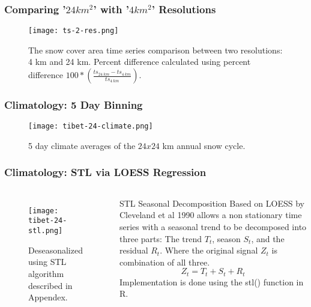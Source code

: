 \begin{frame}
\frametitle{Comparing '$24km^{2}$' with  '$4km^{2}$' Resolutions}
\begin{figure}
\vspace*{-.5cm}
\centering
\begin{minipage}{.7\columnwidth}
\texttt{[image: ts-2-res.png]}
\caption{The snow cover area time series comparison between two resolutions: 4 km and 24 km. Percent difference calculated using percent difference $100 * \left( \frac{ts_{24\ km} - ts_{4\ km}}{ts_{4\ km}} \right)$.}
\end{minipage}
\end{figure}
\end{frame}

\begin{frame}
\frametitle{Climatology: 5 Day Binning}
\begin{figure}
\centering
\begin{minipage}{.5\columnwidth}
\texttt{[image: tibet-24-climate.png]}
\caption{5 day climate averages of the $24 x 24$ km annual snow cycle.}
\end{minipage}
\end{figure}
\end{frame}

\begin{frame}
\frametitle{Climatology: STL via LOESS Regression}
\begin{columns}
\begin{figure}
\centering
\begin{minipage}{1\columnwidth}
\texttt{[image: tibet-24-stl.png]}
\caption{Deseasonalized using STL algorithm described in Appendex.}
\end{minipage}
\end{figure}
\begin{block}{STL}
Seasonal Decomposition Based on LOESS by Cleveland et al 1990 allows a non stationary time series with a seasonal trend to be decomposed into three parts: The trend $T_t$, season $S_t$, and the residual $R_t$. Where the original signal $Z_t$ is combination of all three.
\begin{equation*}
Z_t = T_t + S_t + R_t
\end{equation*}
Implementation is done using the stl() function in R.
\end{block}
\end{columns}
\end{frame}

